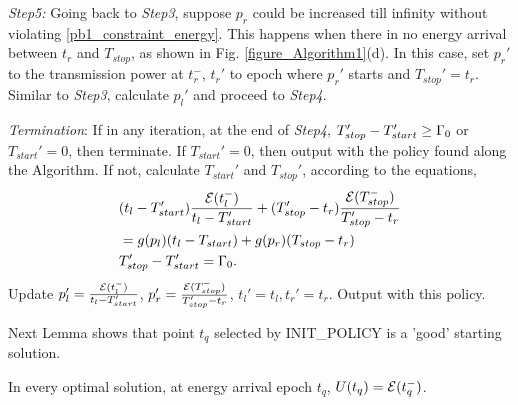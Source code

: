 \textit{Step5:} Going back to \textit{Step3}, suppose $p_r$ could be increased till infinity without violating \eqref{pb1_constraint_energy}. This happens when there in no energy arrival between $t_r$ and $T_{stop}$, as shown in Fig. \ref{figure_Algorithm1}(d). In this case, set $p_r'$ to the transmission power at $t_r^-$, $t_r'$ to epoch where $p_r'$ starts and $T_{stop}'=t_r$. Similar to \textit{Step3}, calculate $p_l'$ and proceed to \textit{Step4}. 

\textit{Termination}: If in any iteration, at the end of \textit{Step4}, $T_{stop}' - T_{start}' \ge \Gamma_0$ or $T_{start}' = 0$, then terminate. If $T_{start}' = 0$, then output with the policy found along the Algorithm. If not, calculate $T_{start}'$ and $T_{stop}'$, according to the equations,
\begin{align}
&\nonumber (t_l-T_{start}')\frac{\ETx(t_l^-)}{t_l-T_{start}'}+(T_{stop}'-t_r)\frac{\ETx(T_{stop}^-)}{T_{stop}'-t_r}\\
&=g(p_l)(t_l-T_{start})+g(p_r)(T_{stop}-t_r)\\
&T_{stop}'-T_{start}'=\TRx_0.
\label{eq_termination}
\end{align}
Update $p_l'=\frac{\mathcal{E}(t_l^-)}{t_l-T_{start}'}$, $p_r'=\frac{\mathcal{E}(T_{stop}^-)}{T_{stop}'-t_r}$, $t_l'=t_l,t_r'=t_r$. Output with this policy. 

Next Lemma shows that point $t_q$ selected by INIT\_POLICY is a 'good' starting solution.
\begin{lemma}
In every optimal solution, at energy arrival epoch $t_q$, $U(t_q)=\mathcal{E}(t_q^-)$.
\label{lemma_Q}
\end{lemma}

